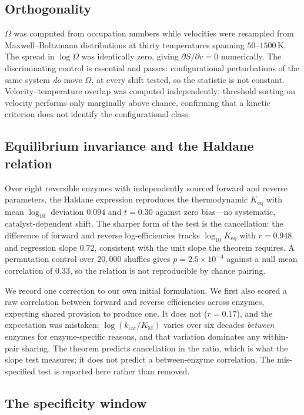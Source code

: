 \documentclass[11pt,twocolumn,a4paper]{article}
\theoremstyle{plain}
\theoremstyle{definition}
\theoremstyle{remark}
\newcommand{\kcat}{k_{\mathrm{cat}}}
\newcommand{\KM}{K_{\mathrm{M}}}
\newcommand{\Keq}{K_{\mathrm{eq}}}
\begin{document}
\subsection{Orthogonality}

$\Omega$ was computed from occupation numbers while velocities were resampled
from Maxwell--Boltzmann distributions at thirty temperatures spanning
$50$--$1500$\,K. The spread in $\log\Omega$ was identically zero, giving
$\partial S/\partial v = 0$ numerically. The discriminating control is
essential and passes: configurational perturbations of the same system
\emph{do} move $\Omega$, at every shift tested, so the statistic is not
constant. Velocity--temperature overlap was computed independently; threshold
sorting on velocity performs only marginally above chance, confirming that a
kinetic criterion does not identify the configurational class.

\subsection{Equilibrium invariance and the Haldane relation}

Over eight reversible enzymes with independently sourced forward and reverse
parameters, the Haldane expression reproduces the thermodynamic $\Keq$ with
mean $\log_{10}$ deviation $0.094$ and $t = 0.30$ against zero bias---no
systematic, catalyst-dependent shift. The sharper form of the test is the
cancellation: the difference of forward and reverse log-efficiencies tracks
$\log_{10}\Keq$ with $r = 0.948$ and regression slope $0.72$, consistent with
the unit slope the theorem requires. A permutation control over $20{,}000$
shuffles gives $p = 2.5\times10^{-4}$ against a null mean correlation of
$0.33$, so the relation is not reproducible by chance pairing.

We record one correction to our own initial formulation. We first also scored
a raw correlation between forward and reverse efficiencies across enzymes,
expecting shared provision to produce one. It does not ($r = 0.17$), and the
expectation was mistaken: $\log(\kcat/\KM)$ varies over six decades
\emph{between} enzymes for enzyme-specific reasons, and that variation
dominates any within-pair sharing. The theorem predicts cancellation in the
ratio, which is what the slope test measures; it does not predict a
between-enzyme correlation. The mis-specified test is reported here rather
than removed.

\subsection{The specificity window}
\end{document}

